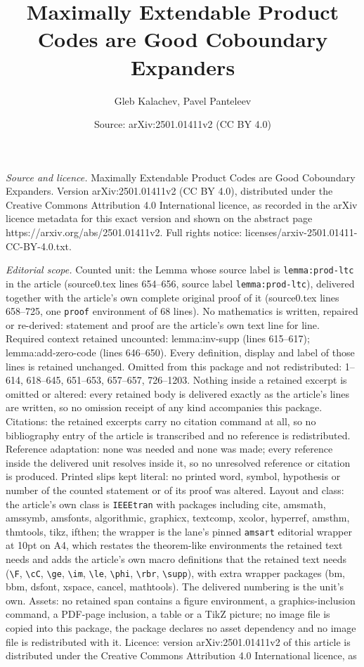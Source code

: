 \documentclass[10pt,a4paper]{amsart}
\title[Maximally Extendable Product Codes are Good Coboundary Expan]{Maximally Extendable Product Codes are Good Coboundary Expanders}
\author{Gleb Kalachev, Pavel Panteleev}
\date{Source: arXiv:2501.01411v2 (CC BY 4.0)}
\begin{document}
\maketitle

\noindent\emph{Source and licence.} Maximally Extendable Product Codes are Good Coboundary Expanders. Version arXiv:2501.01411v2 (CC BY 4.0), distributed under the Creative Commons Attribution 4.0 International licence, as recorded in the arXiv licence metadata for this exact version and shown on the abstract page https://arxiv.org/abs/2501.01411v2. Full rights notice: licenses/arxiv-2501.01411-CC-BY-4.0.txt.\par\smallskip

\noindent\textit{Editorial scope.} Counted unit: the Lemma whose source label is \texttt{lemma:prod-ltc} in the article (source0.tex lines 654--656, source label \texttt{lemma:prod-ltc}), delivered together with the article's own complete original proof of it (source0.tex lines 658--725, one \texttt{proof} environment of 68 lines). No mathematics is written, repaired or re-derived: statement and proof are the article's own text line for line. Required context retained uncounted: lemma:inv-supp (lines 615--617); lemma:add-zero-code (lines 646--650). Every definition, display and label of those lines is retained unchanged. Omitted from this package and not redistributed: 1--614, 618--645, 651--653, 657--657, 726--1203. Nothing inside a retained excerpt is omitted or altered: every retained body is delivered exactly as the article's lines are written, so no omission receipt of any kind accompanies this package. Citations: the retained excerpts carry no citation command at all, so no bibliography entry of the article is transcribed and no reference is redistributed. Reference adaptation: none was needed and none was made; every reference inside the delivered unit resolves inside it, so no unresolved reference or citation is produced. Printed slips kept literal: no printed word, symbol, hypothesis or number of the counted statement or of its proof was altered. Layout and class: the article's own class is \texttt{IEEEtran} with packages including cite, amsmath, amssymb, amsfonts, algorithmic, graphicx, textcomp, xcolor, hyperref, amsthm, thmtools, tikz, ifthen; the wrapper is the lane's pinned \texttt{amsart} editorial wrapper at 10pt on A4, which restates the theorem-like environments the retained text needs and adds the article's own macro definitions that the retained text needs (\texttt{\textbackslash F}, \texttt{\textbackslash cC}, \texttt{\textbackslash ge}, \texttt{\textbackslash im}, \texttt{\textbackslash le}, \texttt{\textbackslash phi}, \texttt{\textbackslash rbr}, \texttt{\textbackslash supp}), with extra wrapper packages (bm, bbm, dsfont, xspace, cancel, mathtools). The delivered numbering is the unit's own. Assets: no retained span contains a figure environment, a graphics-inclusion command, a PDF-page inclusion, a table or a TikZ picture; no image file is copied into this package, the package declares no asset dependency and no image file is redistributed with it. Licence: version arXiv:2501.01411v2 of this article is distributed under the Creative Commons Attribution 4.0 International licence, as 
\end{document}
